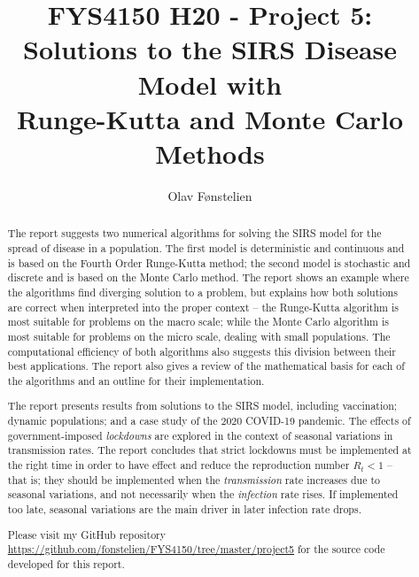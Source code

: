 \documentclass[]{article}
\title{FYS4150 H20 - Project 5:\\Solutions to the SIRS Disease Model with\\Runge-Kutta and Monte Carlo Methods}
\author{Olav Fønstelien}
\begin{document}
\maketitle

\begin{abstract}

The report suggests two numerical algorithms for solving the SIRS model for the spread of disease in a population. The first model is deterministic and continuous and is based on the Fourth Order Runge-Kutta method; the second model is stochastic and discrete and is based on the Monte Carlo method. The report shows an example where the algorithms find diverging solution to a problem, but explains how both solutions are correct when interpreted into the proper context -- the Runge-Kutta algorithm is most suitable for problems on the macro scale; while the Monte Carlo algorithm is most suitable for problems on the micro scale, dealing with small populations. The computational efficiency of both algorithms also suggests this division between their best applications. The report also gives a review of the mathematical basis for each of the algorithms and an outline for their implementation.

The report presents results from solutions to the SIRS model, including vaccination; dynamic populations; and a case study of the 2020 COVID-19 pandemic. The effects of government-imposed \textit{lockdowns} are explored in the context of seasonal variations in transmission rates. The report concludes that strict lockdowns must be implemented at the right time in order to have effect and reduce the reproduction number $R_t < 1$ -- that is; they should be implemented when the \textit{transmission} rate increases due to seasonal variations, and not necessarily when the \textit{infection} rate rises. If implemented too late, seasonal variations are the main driver in later infection rate drops.

Please visit my GitHub repository \url{https://github.com/fonstelien/FYS4150/tree/master/project5} for the source code developed for this report.


\end{abstract}
\end{document}

